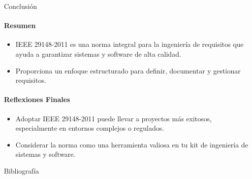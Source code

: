 \documentclass[
  24pt, %
  aspectratio=169, %
]{beamer}
\begin{document}
\begin{frame}{Conclusión}
\framesubtitle{Resumen}
\begin{itemize}
    \item IEEE 29148-2011 es una norma integral para la ingeniería de requisitos que ayuda a garantizar sistemas y software de alta calidad.
    \item Proporciona un enfoque estructurado para definir, documentar y gestionar requisitos.
\end{itemize}

\framesubtitle{Reflexiones Finales}
\begin{itemize}
    \item Adoptar IEEE 29148-2011 puede llevar a proyectos más exitosos, especialmente en entornos complejos o regulados.
    \item Considerar la norma como una herramienta valiosa en tu kit de ingeniería de sistemas y software.
\end{itemize}
\end{frame}


\begin{frame}{Bibliografía}
  \tiny
  
  
\end{frame}
\end{document}
